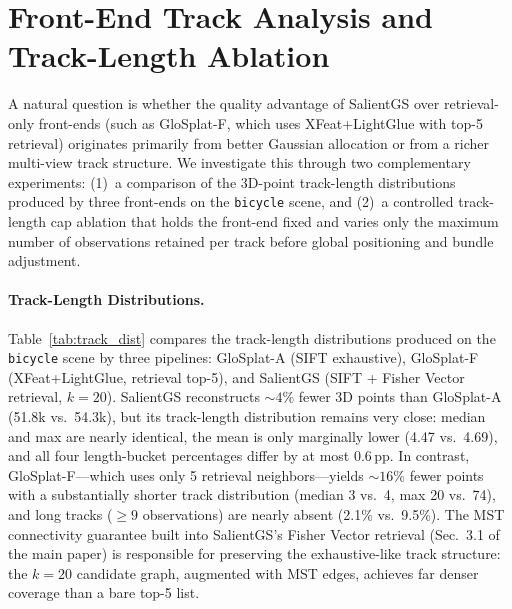 \documentclass[sigconf]{acmart}
\begin{document}
\section{Front-End Track Analysis and Track-Length Ablation}
\label{sec:supp_track_analysis}

A natural question is whether the quality advantage of SalientGS over retrieval-only front-ends (such as GloSplat-F, which uses XFeat+LightGlue with top-5 retrieval) originates primarily from better Gaussian allocation or from a richer multi-view track structure. We investigate this through two complementary experiments: (1)~a comparison of the 3D-point track-length distributions produced by three front-ends on the \texttt{bicycle} scene, and (2)~a controlled track-length cap ablation that holds the front-end fixed and varies only the maximum number of observations retained per track before global positioning and bundle adjustment.

\paragraph{Track-Length Distributions.}
Table~\ref{tab:track_dist} compares the track-length distributions produced on the \texttt{bicycle} scene by three pipelines: GloSplat-A (SIFT exhaustive), GloSplat-F (XFeat+LightGlue, retrieval top-5), and SalientGS (SIFT + Fisher Vector retrieval, $k{=}20$).
SalientGS reconstructs ${\sim}4\%$ fewer 3D points than GloSplat-A (51.8k vs.\ 54.3k), but its track-length distribution remains very close: median and max are nearly identical, the mean is only marginally lower (4.47 vs.\ 4.69), and all four length-bucket percentages differ by at most 0.6\,pp.
In contrast, GloSplat-F---which uses only 5 retrieval neighbors---yields ${\sim}16\%$ fewer points with a substantially shorter track distribution (median 3 vs.\ 4, max 20 vs.\ 74), and long tracks (${\ge}9$ observations) are nearly absent (2.1\% vs.\ 9.5\%).
The MST connectivity guarantee built into SalientGS's Fisher Vector retrieval (Sec.~3.1 of the main paper) is responsible for preserving the exhaustive-like track structure: the $k{=}20$ candidate graph, augmented with MST edges, achieves far denser coverage than a bare top-5 list.
\end{document}
